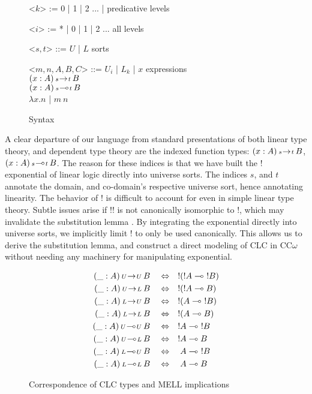 \documentclass{article}
\theoremstyle{definition}
\newcommand{\indalt}[1][2]{\\\hspace*{-1.2em}\textbar\quad}
\newcommand{\arw}[2]
{\hspace*{0.2em}{\scriptstyle #1}\hspace*{-0.2em}
\rightarrow
\hspace*{-0.2em}{\scriptstyle #2}\hspace*{0.2em}}
\newcommand{\lrw}[2]
{\hspace*{0.2em}{\scriptstyle #1}\hspace*{-0.2em}
\multimap
\hspace*{-0.2em}{\scriptstyle #2}\hspace*{0.2em}}
\begin{document}
  \begin{figure}[H]
    \caption{Syntax}
    \centering
    \begin{minipage}{0.8\linewidth}
    \begin{grammar}
      <$k$> := 0 | 1 | 2 ... | \phantom{*} \hspace*{5.8em} predicative levels

      <$i$> := * | 0 | 1 | 2 ... \hspace*{5.8em} all levels

      <$s, t$> ::= $U$ | $L$ \phantom{| $x$} \hspace*{8em} sorts

      <$m, n, A, B, C$> ::= $U_i$ | $L_k$ | $x$ \hspace*{7.3em} expressions
      \indalt $(x : A) \arw{s}{t} B$
      \indalt $(x : A) \lrw{s}{t} B$
      \indalt $\lambda x. n$ | $m\ n$
    \end{grammar}
    \end{minipage}
    \label{syntax}
  \end{figure}
  A clear departure of our language from standard presentations of both linear type theory, and dependent type theory are the indexed function types: $(x : A) \arw{s}{t} B$, $(x : A) \lrw{s}{t} B$. The reason for these indices is that we have built the ! exponential of linear logic directly into universe sorts. The indices $s$, and $t$ annotate the domain, and co-domain's respective universe sort, hence annotating linearity. The behavior of ! is difficult to account for even in simple linear type theory. Subtle issues arise if !! is not canonically isomorphic to !, which may invalidate the substitution lemma \cite{substitute}. By integrating the exponential directly into universe sorts, we implicitly limit ! to only be used canonically. This allows us to derive the substitution lemma, and construct a direct modeling of CLC in CC$\omega$ without needing any machinery for manipulating exponential.
  \begin{figure}[H]
    \caption{Correspondence of CLC types and MELL implications}
    \begin{align}
      (\_ : A) \arw{U}{U} B \quad &\Leftrightarrow \quad !(!A \multimap\ !B) \\
      (\_ : A) \arw{U}{L} B \quad &\Leftrightarrow \quad !(!A \multimap B) \\
      (\_ : A) \arw{L}{U} B \quad &\Leftrightarrow \quad !(A \multimap\ !B) \\
      (\_ : A) \arw{L}{L} B \quad &\Leftrightarrow \quad !(A \multimap B) \\
      (\_ : A) \lrw{U}{U} B \quad &\Leftrightarrow \quad !A \multimap\ !B \\
      (\_ : A) \lrw{U}{L} B \quad &\Leftrightarrow \quad !A \multimap B \\
      (\_ : A) \lrw{L}{U} B \quad &\Leftrightarrow \quad A \multimap\ !B \\
      (\_ : A) \lrw{L}{L} B \quad &\Leftrightarrow \quad A \multimap B
    \end{align}
    \label{correspondence}
  \end{figure}
\end{document}
